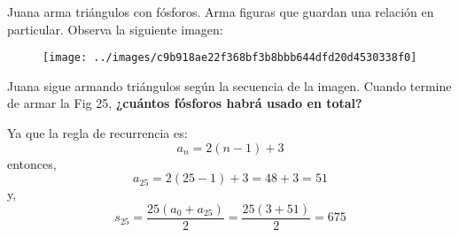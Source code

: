 Juana arma triángulos con fósforos. Arma figuras que guardan una relación en particular. Observa la siguiente imagen:

\begin{minipage}{0.4\linewidth}
    \begin{figure}[H]
        \centering
        \texttt{[image: ../images/c9b918ae22f368bf3b8bbb644dfd20d4530338f0]}
    \end{figure}
\end{minipage}\hfill
\begin{minipage}{0.6\linewidth}
    Juana sigue armando triángulos según la secuencia de la imagen.
    Cuando termine de armar la Fig 25,
    \textbf{¿cuántos fósforos habrá usado en total?}\\
\end{minipage}

\begin{solutionbox}{4cm}
    Ya que la regla de recurrencia es:
    \[a_n=2(n-1)+3\]
    entonces,
    \[a_{25}=2(25-1)+3=48+3=51\]
    y,
    \[s_{25}=\dfrac{25(a_0+a_{25})}{2}=\dfrac{25(3+51)}{2}=675\]\end{solutionbox}
